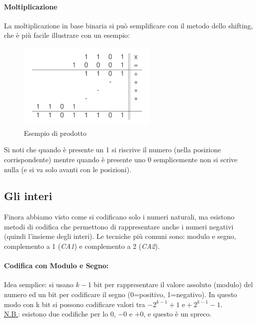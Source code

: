 \paragraph*{Moltiplicazione} La moltiplicazione in base binaria si può semplificare con il metodo dello shifting, che è più facile illustrare con un esempio:  \begin{figure}[H]
	\centering
	\includegraphics[width=0.6\textwidth,keepaspectratio]{images/Moltiplicazione-Bin.png}
	\caption{Esempio di prodotto}
\end{figure}
Si noti che quando è presente un 1 si riscrive il numero (nella posizione corrispondente) mentre  quando è presente uno 0 semplicemente non si scrive nulla (e si va solo avanti con le posizioni).

\subsection{Gli interi} Finora abbiamo visto come si codificano solo i numeri naturali, ma esistono metodi di codifica che permettono di rappresentare anche i numeri negativi (quindi l’insieme degli interi). Le tecniche più comuni sono: modulo e segno, complemento a 1 (\textit{CA1}) e complemento a 2 (\textit{CA2}).

\paragraph*{Codifica con Modulo e Segno:} Idea semplice: si usano $k-1$ bit per rappresentare il valore assoluto (modulo) del numero  ed un bit per codificare il segno (0=positivo, 1=negativo). In questo modo con k bit si possono codificare valori tra $-2^{k-1}+1 \text{ e} +2^{k-1}-1$.\\
\underline{N.B.}: esistono due codifiche per lo $0$, $-0$  e $+0$, e questo è un spreco.

